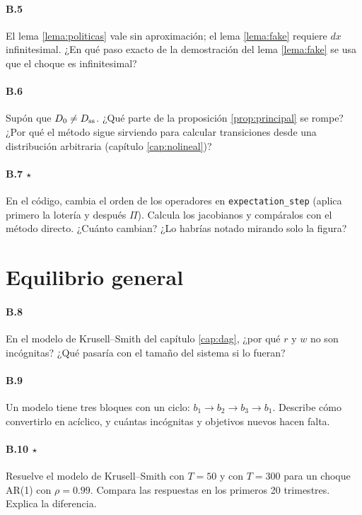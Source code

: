 \paragraph{B.5} El lema \ref{lema:politicas} vale sin aproximación; el lema
\ref{lema:fake} requiere $dx$ infinitesimal. ¿En qué paso exacto de la
demostración del lema \ref{lema:fake} se usa que el choque es infinitesimal?

\paragraph{B.6} Supón que $D_0 \neq D_{\mathrm{ss}}$. ¿Qué parte de la proposición
\ref{prop:principal} se rompe? ¿Por qué el método sigue sirviendo para calcular
transiciones desde una distribución arbitraria (capítulo \ref{cap:nolineal})?

\paragraph{B.7 $\star$} En el código, cambia el orden de los operadores en
\texttt{expectation\_step} (aplica primero la lotería y después $\Pi$). Calcula
los jacobianos y compáralos con el método directo. ¿Cuánto cambian? ¿Lo habrías
notado mirando solo la figura?

\section{Equilibrio general}

\paragraph{B.8} En el modelo de Krusell--Smith del capítulo \ref{cap:dag}, ¿por
qué $r$ y $w$ no son incógnitas? ¿Qué pasaría con el tamaño del sistema si lo
fueran?

\paragraph{B.9} Un modelo tiene tres bloques con un ciclo: $b_1\to b_2 \to b_3
\to b_1$. Describe cómo convertirlo en acíclico, y cuántas incógnitas y objetivos
nuevos hacen falta.

\paragraph{B.10 $\star$} Resuelve el modelo de Krusell--Smith con $T=50$ y con
$T=300$ para un choque AR(1) con $\rho=0.99$. Compara las respuestas en los
primeros 20 trimestres. Explica la diferencia.

